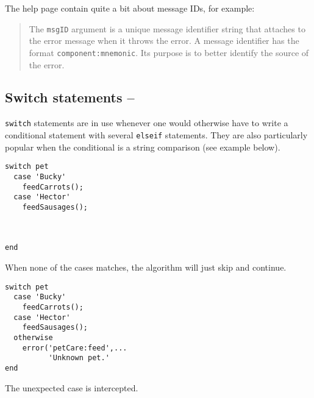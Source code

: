 The \matlab{} help page contain quite a bit about message IDs, for example:
\begin{quotation}
The \lstinline!msgID! argument is a unique message identifier string that \matlab{} attaches to the error message when it throws the error. A message identifier has the format \lstinline!component:mnemonic!. Its purpose is to better identify the source of the error.
\end{quotation}


\subsection{Switch statements -- \cleansymbol\cleansymbol}

\lstinline!switch! statements are in use whenever one would otherwise have to write a conditional statement with several \lstinline!elseif! statements. They are also particularly popular when the conditional is a string comparison (see example below).

\hfill
\begin{minipage}[t]{.45\textwidth}
\begin{lstlisting}[framerule=2pt,rulecolor=\color{badred}]
switch pet
  case 'Bucky'
    feedCarrots();
  case 'Hector'
    feedSausages();



end
\end{lstlisting}
When none of the cases matches, the algorithm will just skip and continue.
\end{minipage}
\hfill
\begin{minipage}[t]{.45\textwidth}
\begin{verbatim}
switch pet
  case 'Bucky'
    feedCarrots();
  case 'Hector'
    feedSausages();
  otherwise
    error('petCare:feed',...
          'Unknown pet.'
end
\end{verbatim}
The unexpected case is intercepted.
\end{minipage}
\hfill



